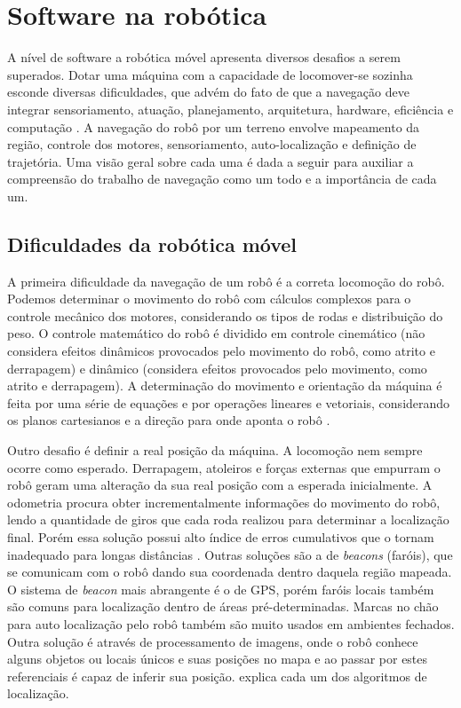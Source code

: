 \section{Software na robótica}

A nível de software a robótica móvel apresenta diversos desafios a serem superados. Dotar uma máquina com a capacidade de locomover-se sozinha esconde diversas dificuldades, que advém do fato de que a navegação deve integrar sensoriamento, atuação, planejamento, arquitetura, hardware, eficiência e computação \cite{Souza2008}. A navegação do robô por um terreno envolve mapeamento da região, controle dos motores, sensoriamento, auto-localização e definição de trajetória. Uma visão geral sobre cada uma é dada a seguir para auxiliar a compreensão do trabalho de navegação como um todo e a importância de cada um.

\subsection{Dificuldades da robótica móvel}

A primeira dificuldade da navegação de um robô é a correta locomoção do robô. Podemos determinar o movimento do robô com cálculos complexos para o controle mecânico dos motores, considerando os tipos de rodas e distribuição do peso. O controle matemático do robô é dividido em controle cinemático (não considera efeitos dinâmicos provocados pelo movimento do robô, como atrito e derrapagem) e dinâmico (considera efeitos provocados pelo movimento, como atrito e derrapagem). A determinação do movimento e orientação da máquina é feita por uma série de equações e por operações lineares e vetoriais, considerando os planos cartesianos e a direção para onde aponta o robô \cite{Siegwart2004}.

Outro desafio é definir a real posição da máquina. A locomoção nem sempre ocorre como esperado. Derrapagem, atoleiros e forças externas que empurram o robô geram uma alteração da sua real posição com a esperada inicialmente. A odometria procura obter incrementalmente informações do movimento do robô, lendo a quantidade de giros que cada roda realizou para determinar a localização final. Porém essa solução possui alto índice de erros cumulativos que o tornam inadequado para longas distâncias \cite{Pereira2003}. Outras soluções são a de \textit{beacons} (faróis), que se comunicam com o robô dando sua coordenada dentro daquela região mapeada. O sistema de \textit{beacon} mais abrangente é o de GPS, porém faróis locais também são comuns para localização dentro de áreas pré-determinadas. Marcas no chão para auto localização pelo robô também são muito usados em ambientes fechados. Outra solução é através de processamento de imagens, onde o robô conhece alguns objetos ou locais únicos e suas posições no mapa e ao passar por estes referenciais é capaz de inferir sua posição. \cite{Borenstein1996} explica cada um dos algoritmos de localização.

